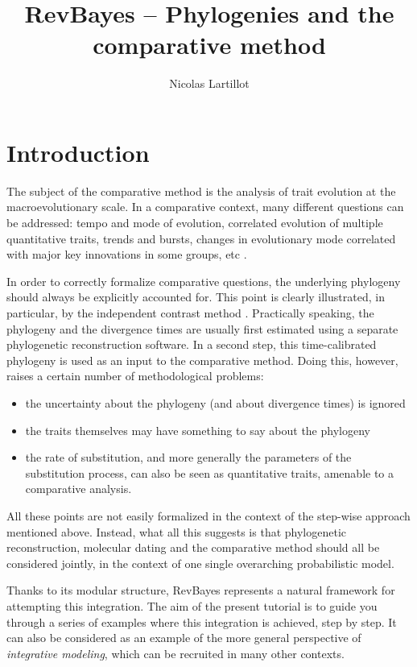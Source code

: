 \documentclass[usletter]{article}
\title{RevBayes -- Phylogenies and the comparative method}
\author{Nicolas Lartillot}
\begin{document}
\maketitle

\section*{Introduction}

The subject of the comparative method is the analysis of trait evolution at the macroevolutionary scale.
In a comparative context, many different questions can be addressed: tempo and mode of evolution, correlated evolution of multiple quantitative traits, trends and bursts, changes in evolutionary mode correlated with major key innovations in some groups, etc \citep[see][for a good introduction]{Harvey:1991p899}.

In order to correctly formalize comparative questions, the underlying phylogeny should always be explicitly accounted for. This point is clearly illustrated, in particular, by the independent contrast method \citep{Felsenstein:1985p686}. Practically speaking, the phylogeny and the divergence times are usually first estimated using a separate phylogenetic reconstruction software. In a second step, this time-calibrated phylogeny is used as an input to the comparative method.
Doing this, however, raises a certain number of methodological problems:
\begin{itemize}
\item
the uncertainty about the phylogeny (and about divergence times) is ignored
\item
the traits themselves may have something to say about the phylogeny
\item
the rate of substitution, and more generally the parameters of the substitution process, can also be seen as quantitative traits, amenable to a comparative analysis.
\end{itemize}
All these points are not easily formalized in the context of the step-wise approach mentioned above.
Instead, what all this suggests is that phylogenetic reconstruction, molecular dating and the comparative method should all be considered jointly, in the context of one single overarching probabilistic model.

Thanks to its modular structure, RevBayes represents a natural framework for attempting this integration.
The aim of the present tutorial is to guide you through a series of examples where this integration is achieved, step by step.
It can also be considered as an example of the more general perspective of \emph{integrative modeling}, which can be recruited in many other contexts.
\end{document}
